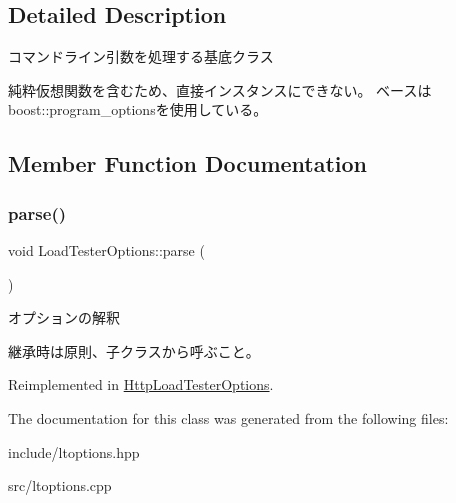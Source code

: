 \subsection{Detailed Description}
コマンドライン引数を処理する基底クラス 

純粋仮想関数を含むため、直接インスタンスにできない。 ベースはboost\+::program\+\_\+optionsを使用している。 

\subsection{Member Function Documentation}
\mbox{\label{class_load_tester_options_ae444c5c2f49cf71d6c63c2eaaf577f62}} 
\subsubsection{\texorpdfstring{parse()}{parse()}}
{\footnotesize\ttfamily void Load\+Tester\+Options\+::parse (\begin{DoxyParamCaption}{ }\end{DoxyParamCaption})\hspace{0.3cm}{\ttfamily [virtual]}}



オプションの解釈 

継承時は原則、子クラスから呼ぶこと。 

Reimplemented in \mbox{\hyperlink{class_http_load_tester_options_a5b5ce6c59de007c423d7da2481622b09}{Http\+Load\+Tester\+Options}}.



The documentation for this class was generated from the following files\+:\begin{DoxyCompactItemize}
\item 
include/ltoptions.\+hpp\item 
src/ltoptions.\+cpp\end{DoxyCompactItemize}
